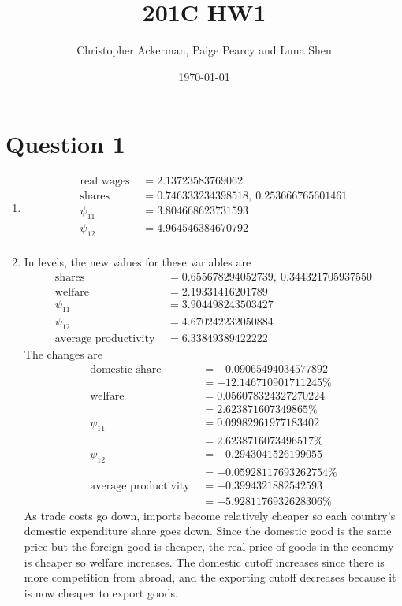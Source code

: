 
\usepackage[space]{grffile}

\title{201C HW1}
\author{Christopher Ackerman, Paige Pearcy and Luna Shen}
\date{\today}


\maketitle
\section{Question 1}
\begin{enumerate}
\item
  \begin{align*}
    \text{real wages } &= 2.13723583769062\\
    \text{shares } &= 0.746333234398518, \	0.253666765601461\\
    \psi_{11} &= 3.804668623731593\\
    \psi_{12} &= 4.964546384670792\\
  \end{align*}
\item
  In levels, the new values for these variables are
  \begin{align*}
    \text{shares } &= 0.655678294052739, \ 	0.344321705937550\\
    \text{welfare } &= 2.19331416201789\\
    \psi_{11} &= 3.904498243503427 \\
    \psi_{12} &= 4.670242232050884 \\
    \text{average productivity } &= 6.33849389422222
  \end{align*}
  The changes are
  \begin{align*}
    \text{domestic share } &= -0.09065494034577892\\
    &= - 12.146710901711245 \% \\
    \text{welfare } &=0.056078324327270224\\
    &= 2.623871607349865 \%\\
    \psi_{11} &= 0.09982961977183402 \\
    &= 2.6238716073496517 \% \\
    \psi_{12} &= - 0.2943041526199055 \\
    &= - 0.05928117693262754 \% \\
    \text{average productivity } &= -0.3994321882542593\\
    &= -5.9281176932628306 \%
  \end{align*}
  As trade costs go down, imports become relatively cheaper so each country's domestic expenditure share goes down. Since the domestic good is the same price but the foreign good is cheaper, the real price of goods in the economy is cheaper so welfare increases. The domestic cutoff increases since there is more competition from abroad, and the exporting cutoff decreases because it is now cheaper to export goods.


\end{enumerate}
